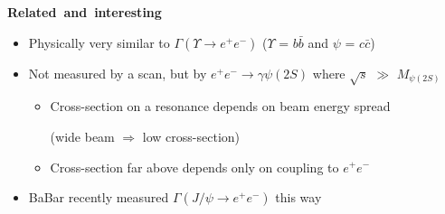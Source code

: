 \documentclass[landscape]{article}
\newenvironment{slide}[1][ ]{\mbox{\bf \boldmath #1 } \vfill}{\vfill \vspace{-1.5 cm} \mbox{ } \pagebreak}
\newenvironment{itemizer}[1]{\begin{itemize}\setlength{\itemsep}{#1}}{\end{itemize}}
\begin{document}
\begin{slide}[Related and interesting]

\vfill
\begin{center}
\end{center}

\vfill
\begin{itemizer}{1 cm}

  \item Physically very similar to $\Gamma(\Upsilon \to e^+e^-)$ ($\Upsilon$ = $b\bar{b}$ and $\psi$ = $c\bar{c}$)

  \item Not measured by a scan, but by $e^+e^- \to \gamma \psi(2S)$ where $\sqrt{s}$ $\gg$ $M_{\psi(2S)}$

    \begin{itemizer}{0.75 cm}

      \item Cross-section on a resonance depends on beam energy spread

	(wide beam $\Rightarrow$ low cross-section)

      \item Cross-section far above depends only on coupling to $e^+e^-$

    \end{itemizer}

  \item BaBar recently measured $\Gamma(J/\psi \to e^+e^-)$ this way

\end{itemizer}

\vfill

\end{slide}
\end{document}
